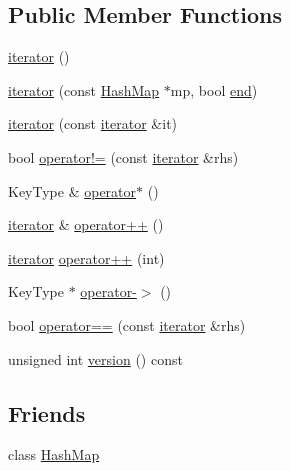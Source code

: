 \subsection*{Public Member Functions}
\begin{DoxyCompactItemize}
\item 
\mbox{\hyperlink{classHashMap_1_1iterator_a67d652c2433cf9217ed2a1485092fdd1}{iterator}} ()
\item 
\mbox{\hyperlink{classHashMap_1_1iterator_a1181555cedbd9186b537b54bc4e4fe53}{iterator}} (const \mbox{\hyperlink{classHashMap}{Hash\+Map}} $\ast$mp, bool \mbox{\hyperlink{classHashMap_a68b688a51bd0cf6fb5bc2cba292209a8}{end}})
\item 
\mbox{\hyperlink{classHashMap_1_1iterator_a698b7553261e7209d6c29fb55627dce4}{iterator}} (const \mbox{\hyperlink{classHashMap_1_1iterator}{iterator}} \&it)
\item 
bool \mbox{\hyperlink{classHashMap_1_1iterator_ae1983f2cb0df1f0cbe77ac29590e2e2b}{operator!=}} (const \mbox{\hyperlink{classHashMap_1_1iterator}{iterator}} \&rhs)
\item 
Key\+Type \& \mbox{\hyperlink{classHashMap_1_1iterator_a26107e2ced3252ee2bf81dd666739da7}{operator$\ast$}} ()
\item 
\mbox{\hyperlink{classHashMap_1_1iterator}{iterator}} \& \mbox{\hyperlink{classHashMap_1_1iterator_af1b1c7856a59f34c7d3570f946a2ff00}{operator++}} ()
\item 
\mbox{\hyperlink{classHashMap_1_1iterator}{iterator}} \mbox{\hyperlink{classHashMap_1_1iterator_a538d230f8b52d2bc0950e26ce74ec239}{operator++}} (int)
\item 
Key\+Type $\ast$ \mbox{\hyperlink{classHashMap_1_1iterator_a917c74872cce637554f68ebe3c666785}{operator-\/$>$}} ()
\item 
bool \mbox{\hyperlink{classHashMap_1_1iterator_a798956e7a65ef16c891d129b3ced0f9e}{operator==}} (const \mbox{\hyperlink{classHashMap_1_1iterator}{iterator}} \&rhs)
\item 
unsigned int \mbox{\hyperlink{classHashMap_1_1iterator_a0aa696ccb72cbf928535d6b646bac1aa}{version}} () const
\end{DoxyCompactItemize}
\subsection*{Friends}
\begin{DoxyCompactItemize}
\item 
class \mbox{\hyperlink{classHashMap_1_1iterator_ab6054287e6f409207af3fa16e49046ad}{Hash\+Map}}
\end{DoxyCompactItemize}


